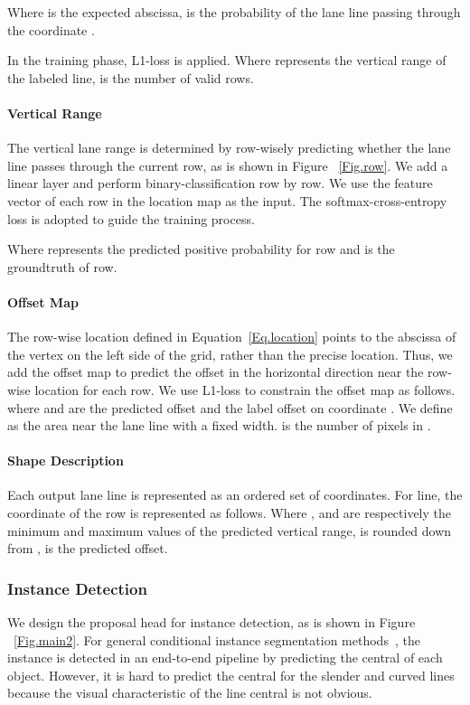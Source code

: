 \documentclass[10pt,twocolumn,letterpaper]{article}
\begin{document}
 Where  is the expected abscissa,  is the probability of the lane line passing through the coordinate .

In the training phase, L1-loss is applied.
Where  represents the vertical range of the labeled line,  is the number of valid rows.

\paragraph{Vertical Range}
The vertical lane range is determined by row-wisely predicting whether the lane line passes through the current row, as is shown in Figure ~\ref{Fig.row}. We add a linear layer and perform binary-classification row by row. We use the feature vector of each row in the location map as the input. The softmax-cross-entropy loss is adopted to guide the training process.

Where  represents the predicted positive probability for  row and  is the groundtruth of  row.

\paragraph{Offset Map}
The row-wise location defined in Equation~\ref{Eq.location} points to the abscissa of the vertex on the left side of the grid, rather than the precise location. Thus, we add the offset map to predict the offset in the horizontal direction near the row-wise location for each row. We use L1-loss to constrain the offset map as follows.
where  and  are the predicted offset and the label offset on coordinate . We define  as the area near the lane line with a fixed width.  is the number of pixels in .

\paragraph{Shape Description}
Each output lane line is represented as an ordered set of coordinates.
For  line, the coordinate  of the  row is represented as follows.
Where ,  and  are respectively the minimum and maximum values of the predicted vertical range,
 is rounded down from ,  is the predicted offset. 

\subsubsection{Instance Detection}
We design the proposal head for instance detection, as is shown in Figure ~\ref{Fig.main2}.
For general conditional instance segmentation methods~\cite{tian2020conditional, wang2020solov2}, the instance is detected in an end-to-end pipeline by predicting the central of each object. 
However, it is hard to predict the central for the slender and curved lines because the visual characteristic of the line central is not obvious.
\end{document}

